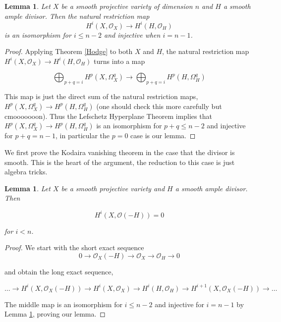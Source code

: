 \documentclass[a4paper]{article}
\newcommand{\OO}{\mathcal{O}}
\newtheorem{lemma}[theorem]{Lemma}
\numberwithin{theorem}{section}
\numberwithin{equation}{section}
\begin{document}
\begin{lemma} \label{alg_lef}
    Let $X$ be a smooth projective variety of dimension $n$ and $H$ a smooth ample divisor. Then the natural restriction map
    $$ H^i(X,\OO_X) \rightarrow H^i(H,\OO_H) $$
    is an isomorphism  for $i \leq n-2$ and injective when $i = n-1$.
\end{lemma}

\begin{proof}
    Applying Theorem \ref{Hodge} to both $X$ and $H$, the natural restriction map $H^i(X,\OO_X) \rightarrow H^i(H,\OO_H)$ turns into a map

    $$ \bigoplus_{p+q=i} H^p(X,\Omega_X^q) \rightarrow \bigoplus_{p+q=i} H^p(H,\Omega_H^q) $$

    This map is just the direct sum of the natural restriction maps, $H^p(X,\Omega_X^q) \rightarrow H^p(H,\Omega_H^q)$ (one should check this more carefully but cmooooooon). Thus the Lefschetz Hyperplane Theorem implies that $H^p(X,\Omega_X^q) \rightarrow H^p(H,\Omega_H^q)$ is an isomorphism for $p+q \leq n-2$ and injective for $p+q = n-1$, in particular the $p = 0$ case is our lemma.
    
\end{proof}

We first prove the Kodaira vanishing theorem in the case that the divisor is smooth. This is the heart of the argument, the reduction to this case is just algebra tricks.

\begin{lemma} \label{kodlem}
    Let $X$ be a smooth projective variety and $H$ a smooth ample divisor. Then 

    $$ H^i(X,\OO(-H)) = 0 $$

    for $i < n$.
\end{lemma}

\begin{proof}
    We start with the short exact sequence 
    $$ 0 \rightarrow \OO_X(-H) \rightarrow \OO_X \rightarrow \OO_H \rightarrow 0 $$

    and obtain the long exact sequence,

    $$ \dots \rightarrow H^i(X,\OO_X(-H)) \rightarrow H^i(X,\OO_X) \rightarrow H^i(H,\OO_H) \rightarrow H^{i+1}(X,\OO_X(-H)) \rightarrow \dots $$

    The middle map is an isomorphism for $i \leq n-2$ and injective for $i = n-1$ by Lemma \ref{alg_lef}, proving our lemma.
    
\end{proof}
\end{document}
